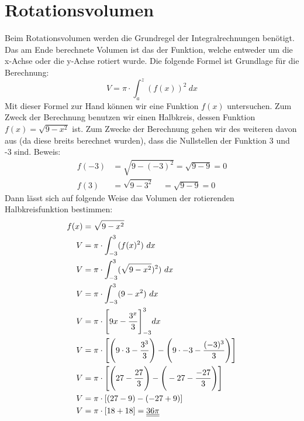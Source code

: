 \documentclass[a4paper,12pt]{article}
\begin{document}
\section{Rotationsvolumen}
Beim Rotationsvolumen werden die Grundregel der Integralrechnungen benötigt. Das am Ende berechnete Volumen ist das der Funktion, welche entweder um die x-Achse oder die y-Achse rotiert wurde.
Die folgende Formel ist Grundlage für die Berechnung:
$$V = \pi \cdot \int_{a}^z (f(x))^2\ dx$$
Mit dieser Formel zur Hand können wir eine Funktion $f(x)$ untersuchen.
Zum Zweck der Berechnung benutzen wir einen Halbkreis, dessen Funktion $f(x) = \sqrt{9 - x^2}$ ist.
Zum Zwecke der Berechnung gehen wir des weiteren davon aus (da diese breits berechnet wurden), dass die Nullstellen der Funktion 3 und -3 sind.
Beweis: 
\begin{equation}
\begin{split}
f(-3) & = \sqrt{9- (-3)^2} = \sqrt{9 - 9} = 0 \\
f(3) & = \sqrt{9- 3^2}\ \ \ \ \ = \sqrt{9 - 9} = 0
\end{split}    
\end{equation}
Dann lässt sich auf folgende Weise das Volumen der rotierenden Halbkreisfunktion bestimmen:
\begin{equation}
\begin{split}
f(x) & = \sqrt{9 - x^2}\\
V & = \pi \cdot \int_{-3}^3 (f(x)^2)\ dx\\
V & = \pi \cdot \int_{-3}^3 (\sqrt{9 - x^2})^2)\ dx\\
V & = \pi \cdot \int_{-3}^3 (9 - x^2)\ dx\\
V & = \pi \cdot \Bigg{[}9x - \frac{3^x}{3}\Bigg{]}_{-3}^{3} dx\\
V & = \pi \cdot \Bigg{[}\Bigg{(}9 \cdot 3 - \frac{3^3}{3}\Bigg{)} - \Bigg{(}9 \cdot -3 - \frac{(-3)^3}{3}\Bigg{)}\Bigg{]}\\
V & = \pi \cdot \Bigg{[}\Bigg{(} 27 - \frac{27}{3} \Bigg{)} - \Bigg{(} -27 - \frac{-27}{3} \Bigg{)}\Bigg{]}\\
V & = \pi \cdot [(27 - 9) - (-27 + 9)]\\
V & = \pi \cdot [18 + 18] = \underline{\underline{36\pi}}
\end{split}    
\end{equation}
\pagebreak
\end{document}
